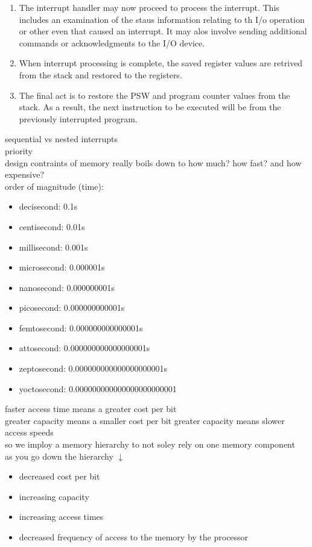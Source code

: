 \documentclass[parindent=0pt]{article}
\begin{document}
\begin{enumerate}
		\item The interrupt handler may now proceed to process the interrupt. This includes an examination of the staus information relating to th I/o operation or other even that caused an interrupt. It may alos involve sending additional commands or acknowledgments to the I/O device.
		
		\item When interrupt processing is complete, the saved register values are retrived from the stack and restored to the registers.
		
		\item The final act is to restore the PSW and program counter values from the stack. As a result, the next instruction to be executed will be from the previously interrupted program.
	\end{enumerate}

sequential vs nested interrupts\\
priority\\

design contraints of memory really boils down to how much? how fast? and how expensive?\\

order of magnitude (time):
	\begin{itemize}
		\item decisecond: 0.1s
		\item centisecond: 0.01s
		\item millisecond: 0.001s
		\item microsecond: 0.000001s
		\item nanosecond: 0.000000001s
		\item picosecond: 0.000000000001s
		\item femtosecond: 0.000000000000001s
		\item attosecond: 0.000000000000000001s
		\item zeptosecond: 0.000000000000000000001s
		\item yoctosecond: 0.000000000000000000000001
	\end{itemize} 

faster access time means a greater cost per bit\\
greater capacity means a smaller cost per bit
greater capacity means slower access speeds\\

so we imploy a memory hierarchy to not soley rely on one memory component\\

as you go down the hierarchy $\downarrow$
	\begin{itemize}
		\item decreased cost per bit
		\item increasing capacity
		\item increasing access times
		\item decreased frequency of access to the memory by the processor
	\end{itemize}
\end{document}
